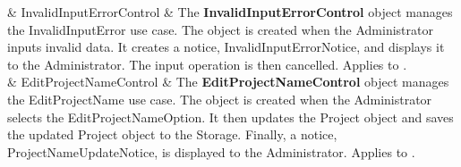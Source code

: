 \documentclass[12pt,letterpaper]{article}
\begin{document}
\begin{center}
\begin{tabu}
		 & Invalid\-Input\-Error\-Control & 
			The {\bf InvalidInputErrorControl} object manages the InvalidInputError use case. The object is created when the Administrator inputs invalid data. It creates a notice, InvalidInputErrorNotice, and displays it to the Administrator. The input operation is then cancelled. Applies to . \\

		 & Edit\-Project\-Name\-Control & 
			The {\bf EditProjectNameControl} object manages the EditProjectName use case. The object is created when the Administrator selects the EditProjectNameOption. It then updates the Project object and saves the updated Project object to the Storage. Finally, a notice, ProjectNameUpdateNotice, is displayed to the Administrator. Applies to . \\
\end{tabu}
\end{center}
\end{document}

